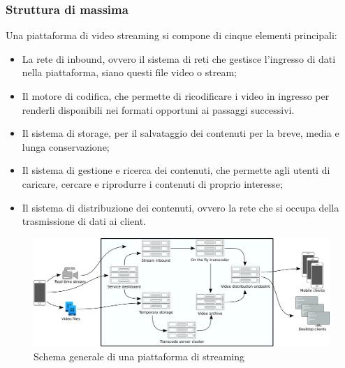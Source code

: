 		\subsubsection{Struttura di massima}
			Una piattaforma di video streaming si compone di cinque elementi principali:
			\begin{itemize}
			\item La rete di inbound, ovvero il sistema di reti che gestisce l'ingresso di dati nella piattaforma, siano questi file video o stream;
			\item Il motore di codifica, che permette di ricodificare i video in ingresso per renderli disponibili nei formati opportuni ai passaggi successivi.
			\item Il sistema di storage, per il salvataggio dei contenuti per la breve, media e lunga conservazione;
			\item Il sistema di gestione e ricerca dei contenuti, che permette agli utenti di caricare, cercare e riprodurre i contenuti di proprio interesse;
			\item Il sistema di distribuzione dei contenuti, ovvero la rete che si occupa della trasmissione di dati ai client.
			\end{itemize}

			\begin{figure}[H]
				\begin{center}
					\includegraphics[width=16.5cm,keepaspectratio]{immagini/schema-architettura-piattaforma-streaming}
					\caption{Schema generale di una piattaforma di streaming}
				\end{center}
			\end{figure}

